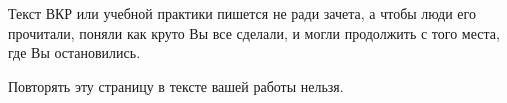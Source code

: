 \documentclass[14pt, russian]{matmex-diploma-custom}
\begin{document}

\maketitle
\setcounter{tocdepth}{2}
\tableofcontents


\pagebreak
\begin{center}
  {\Huge
    Текст ВКР или учебной практики пишется не ради зачета, а чтобы люди его прочитали, поняли как круто Вы все сделали, и могли продолжить с того места, где Вы остановились.}

  \vspace{2em}
  Повторять эту страницу в тексте вашей работы нельзя.
\end{center}
\pagebreak












\setmonofont[Mapping=tex-text]{CMU Typewriter Text}


\end{document}
